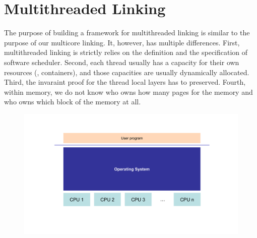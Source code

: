 \section{Multithreaded Linking}
\label{chapter:linking:sec:multithreaded-linking}

The purpose of building a framework for multithreaded linking is similar to 
the purpose of our multicore linking. 
It, however, has multiple differences. 
First, multithreaded linking is 
strictly relies on the definition and the specification of software scheduler.
Second, each thread usually has a capacity for their own resources (\eg, containers),
and those capacities are usually dynamically allocated. 
Third, the invaraint proof for the thread local layers has to preserved. 
Fourth, within memory, we do not know who owns how many pages for the memory 
and who owns which block of the memory at all. 



\begin{figure}
\begin{center}
\includegraphics[width=\textwidth, page=20]{figs/conlink/concurrent_linking}
\end{center}
\end{figure}


%




